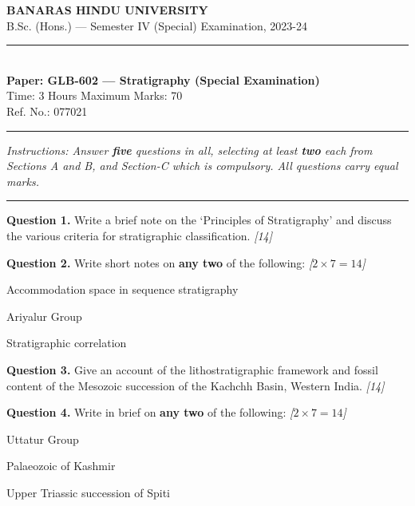 \documentclass[11pt,a4paper]{article}
\newcommand{\pts}[1]{\hfill   \textit{[#1]}}
\begin{document}
\begin{center}
  {\large\bfseries BANARAS HINDU UNIVERSITY}\\[2pt]
  {\normalsize B.Sc. (Hons.) --- Semester IV (Special) Examination, 2023-24}\\[6pt]
  \rule{0.8\linewidth}{0.5pt}\\[6pt]
  {\large\bfseries Paper: GLB-602 --- Stratigraphy (Special Examination)}\\[4pt]
  {\normalsize Time: 3 Hours \hfill Maximum Marks: 70}\\[2pt]
  {\small Ref. No.: 077021}
\end{center}
\rule{\linewidth}{0.4pt}
\smallskip



\noindent   \textit{Instructions: Answer   \textbf{five} questions in all, selecting at least   \textbf{two} each from Sections A and B, and Section-C which is compulsory. All questions carry equal marks.}
\bigskip

\bigskip


\rule{\linewidth}{0.4pt}\smallskip




\noindent   \textbf{Question 1.} Write a brief note on the `Principles of Stratigraphy' and discuss the various criteria for stratigraphic classification. \pts{14}

\medskip


\noindent   \textbf{Question 2.} Write short notes on   \textbf{any two} of the following: \pts{$2  \times 7 = 14$}

\begin{parts}
  \item Accommodation space in sequence stratigraphy
  \item Ariyalur Group
  \item Stratigraphic correlation
\end{parts}

\medskip


\noindent   \textbf{Question 3.} Give an account of the lithostratigraphic framework and fossil content of the Mesozoic succession of the Kachchh Basin, Western India. \pts{14}

\medskip


\noindent   \textbf{Question 4.} Write in brief on   \textbf{any two} of the following: \pts{$2  \times 7 = 14$}

\begin{parts}
  \item Uttatur Group
  \item Palaeozoic of Kashmir
  \item Upper Triassic succession of Spiti
\end{parts}
\end{document}
